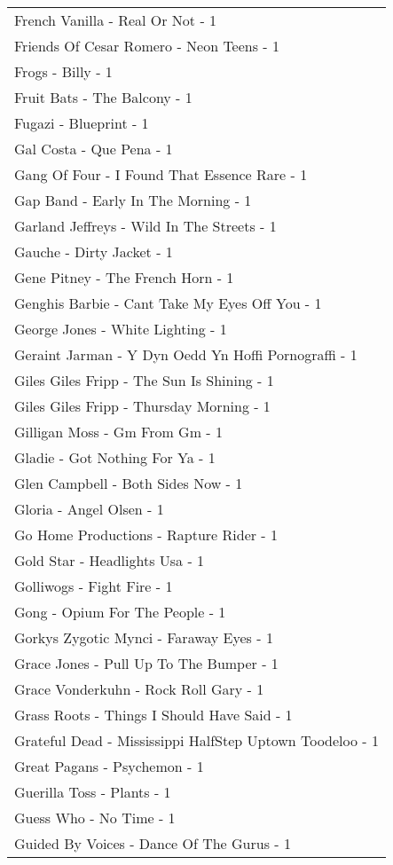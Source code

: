 \documentclass[
]{article}
\begin{document}
\begin{longtable}{l}
French Vanilla - Real Or Not - 1 \\ 
Friends Of Cesar Romero - Neon Teens - 1 \\ 
Frogs - Billy - 1 \\ 
Fruit Bats - The Balcony - 1 \\ 
Fugazi - Blueprint - 1 \\ 
Gal Costa - Que Pena - 1 \\ 
Gang Of Four - I Found That Essence Rare - 1 \\ 
Gap Band - Early In The Morning - 1 \\ 
Garland Jeffreys - Wild In The Streets - 1 \\ 
Gauche - Dirty Jacket - 1 \\ 
Gene Pitney - The French Horn - 1 \\ 
Genghis Barbie - Cant Take My Eyes Off You - 1 \\ 
George Jones - White Lighting - 1 \\ 
Geraint Jarman - Y Dyn Oedd Yn Hoffi Pornograffi - 1 \\ 
Giles Giles Fripp - The Sun Is Shining - 1 \\ 
Giles Giles Fripp - Thursday Morning - 1 \\ 
Gilligan Moss - Gm From Gm - 1 \\ 
Gladie - Got Nothing For Ya - 1 \\ 
Glen Campbell - Both Sides Now - 1 \\ 
Gloria - Angel Olsen - 1 \\ 
Go Home Productions - Rapture Rider - 1 \\ 
Gold Star - Headlights Usa - 1 \\ 
Golliwogs - Fight Fire - 1 \\ 
Gong - Opium For The People - 1 \\ 
Gorkys Zygotic Mynci - Faraway Eyes - 1 \\ 
Grace Jones - Pull Up To The Bumper - 1 \\ 
Grace Vonderkuhn - Rock Roll Gary - 1 \\ 
Grass Roots - Things I Should Have Said - 1 \\ 
Grateful Dead - Mississippi HalfStep Uptown Toodeloo - 1 \\ 
Great Pagans - Psychemon - 1 \\ 
Guerilla Toss - Plants - 1 \\ 
Guess Who - No Time - 1 \\ 
Guided By Voices - Dance Of The Gurus - 1 \\ 

\end{longtable}
\end{document}
